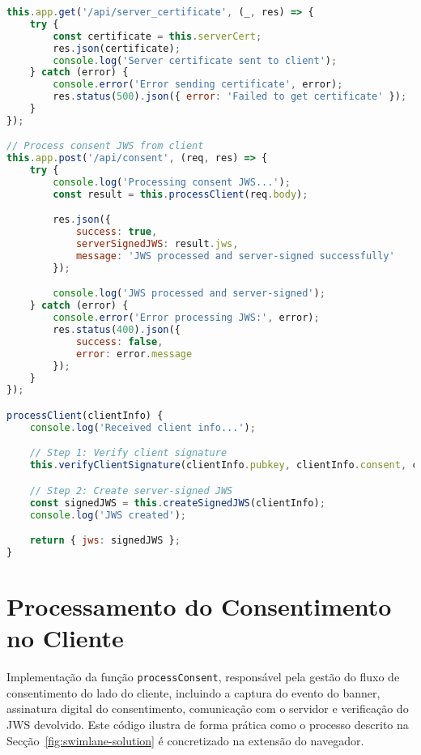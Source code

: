 \begin{lstlisting}[language=Javascript]
this.app.get('/api/server_certificate', (_, res) => {
	try {
		const certificate = this.serverCert;
		res.json(certificate);
		console.log('Server certificate sent to client');
	} catch (error) {
		console.error('Error sending certificate', error);
		res.status(500).json({ error: 'Failed to get certificate' });
	}
});

// Process consent JWS from client
this.app.post('/api/consent', (req, res) => {
	try {
		console.log('Processing consent JWS...');
		const result = this.processClient(req.body);

		res.json({
			success: true,
			serverSignedJWS: result.jws,
			message: 'JWS processed and server-signed successfully'
		});

		console.log('JWS processed and server-signed');
	} catch (error) {
		console.error('Error processing JWS:', error);
		res.status(400).json({
			success: false,
			error: error.message
		});
	}
});

processClient(clientInfo) {
	console.log('Received client info...');

	// Step 1: Verify client signature
	this.verifyClientSignature(clientInfo.pubkey, clientInfo.consent, clientInfo.signature)

	// Step 2: Create server-signed JWS
	const signedJWS = this.createSignedJWS(clientInfo);
	console.log('JWS created');

	return { jws: signedJWS };
}
\end{lstlisting}

\newpage

\section{Processamento do Consentimento no Cliente}
\label{apendice:process-consent}
Implementação da função \texttt{processConsent}, responsável pela gestão do fluxo de consentimento do lado do cliente, incluindo a captura do evento do banner, assinatura digital do consentimento, comunicação com o servidor e verificação do JWS devolvido. Este código ilustra de forma prática como o processo descrito na Secção~\ref{fig:swimlane-solution} é concretizado na extensão do navegador.  

